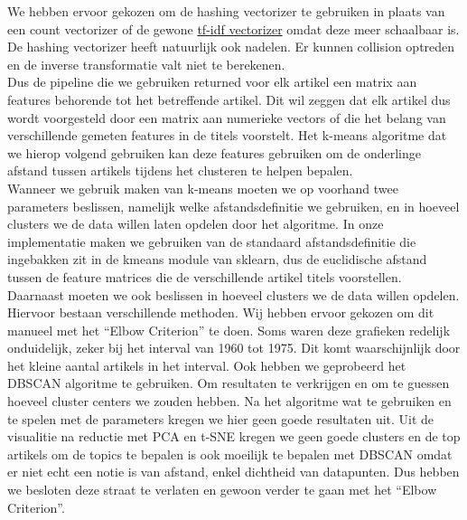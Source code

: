 \documentclass[a4paper,fontsize=11pt]{article}
\begin{document}
We hebben ervoor gekozen om de hashing vectorizer te gebruiken in plaats van een count vectorizer of de gewone \hyperlink{https://scikit-learn.org/stable/modules/generated/sklearn.feature_extraction.text.TfidfVectorizer.html}{tf-idf vectorizer} omdat deze meer schaalbaar is. De hashing vectorizer heeft natuurlijk ook nadelen. Er kunnen collision optreden en de inverse transformatie valt niet te berekenen. \\

Dus de pipeline die we gebruiken returned voor elk artikel een matrix aan features behorende tot het betreffende artikel. Dit wil zeggen dat elk artikel dus wordt voorgesteld door een matrix aan numerieke vectors of die het belang van verschillende gemeten features in de titels voorstelt. Het k-means algoritme dat we hierop volgend gebruiken kan deze features gebruiken om de onderlinge afstand tussen artikels tijdens het clusteren te helpen bepalen. \\

Wanneer we gebruik maken van k-means moeten we op voorhand twee parameters beslissen, namelijk welke afstandsdefinitie we gebruiken, en in hoeveel clusters we de data willen laten opdelen door het algoritme. In onze implementatie maken we gebruiken van de standaard afstandsdefinitie die ingebakken zit in de kmeans module van sklearn, dus de euclidische afstand tussen de feature matrices die de verschillende artikel titels voorstellen. Daarnaast moeten we ook beslissen in hoeveel clusters we de data willen opdelen. Hiervoor bestaan verschillende methoden.
Wij hebben ervoor gekozen om dit manueel met het ``Elbow Criterion'' te doen. Soms waren deze grafieken redelijk onduidelijk, zeker bij het interval van 1960 tot 1975. Dit komt waarschijnlijk door het kleine aantal artikels in het interval. Ook hebben we geprobeerd het DBSCAN algoritme te gebruiken. Om resultaten te verkrijgen en om te guessen hoeveel cluster centers we zouden hebben. Na het algoritme wat te gebruiken en te spelen met de parameters kregen we hier geen goede resultaten uit. Uit de visualitie na reductie met PCA en t-SNE kregen we geen goede clusters en de top artikels om de topics te bepalen is ook moeilijk te bepalen met DBSCAN omdat er niet echt een notie is van afstand, enkel dichtheid van datapunten. Dus hebben we besloten deze straat te verlaten en gewoon verder te gaan met het ``Elbow Criterion''.

\end{document}

